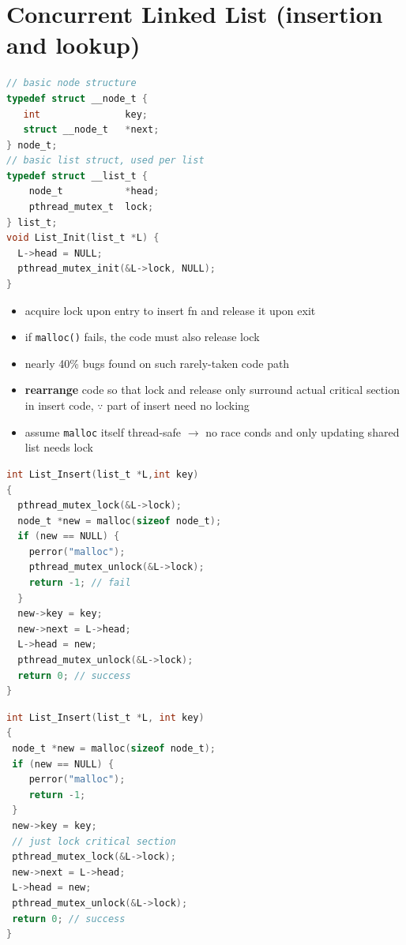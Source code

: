 \section*{Concurrent Linked List (insertion and lookup)}
\begin{minipage}{.52\linewidth}
\begin{lstlisting}[language=c,xleftmargin=-4pt]
// basic node structure
typedef struct __node_t {
   int               key;
   struct __node_t   *next;
} node_t;
// basic list struct, used per list
typedef struct __list_t {
    node_t           *head;
    pthread_mutex_t  lock;
} list_t;
void List_Init(list_t *L) {
  L->head = NULL;
  pthread_mutex_init(&L->lock, NULL);
}
\end{lstlisting}
\end{minipage}
\begin{minipage}{.48\linewidth}
  \flushleft
  \begin{itemize}
  \item acquire lock upon entry to insert fn and release it upon exit
  \item if \texttt{malloc()} fails, the code must also release lock
  \item nearly 40\% bugs found on such rarely-taken code path
  \item \textbf{rearrange} code so that lock and release only surround actual critical section in insert code, $\because$ part of insert need no locking
  \item assume \texttt{malloc} itself thread-safe $\to$ no race conds and only updating shared list needs lock
  \end{itemize}
\end{minipage}
\begin{minipage}{.53\linewidth}
\begin{lstlisting}[language=c,xleftmargin=-4pt]
int List_Insert(list_t *L,int key)
{
  pthread_mutex_lock(&L->lock);
  node_t *new = malloc(sizeof node_t);
  if (new == NULL) {
    perror("malloc");
    pthread_mutex_unlock(&L->lock);
    return -1; // fail
  }
  new->key = key;
  new->next = L->head;
  L->head = new;
  pthread_mutex_unlock(&L->lock);
  return 0; // success
}
\end{lstlisting}
\end{minipage}
\begin{minipage}{.53\linewidth}
\begin{lstlisting}[language=c,xleftmargin=2pt]
int List_Insert(list_t *L, int key)
{
 node_t *new = malloc(sizeof node_t);
 if (new == NULL) {
    perror("malloc");
    return -1;
 }
 new->key = key;
 // just lock critical section
 pthread_mutex_lock(&L->lock);
 new->next = L->head;
 L->head = new;
 pthread_mutex_unlock(&L->lock);
 return 0; // success
}
\end{lstlisting}
\end{minipage}
